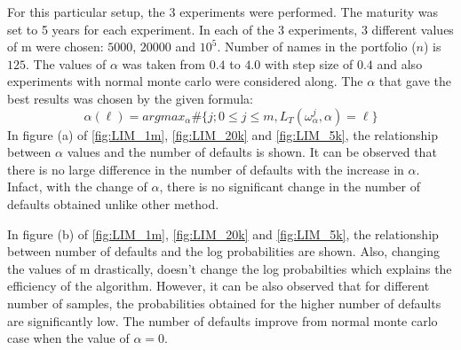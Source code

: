 For this particular setup, the 3 experiments were performed. The maturity was set to 5 years for each experiment. In each of the 3 experiments, 3 different values of m were chosen: $5000$, $20000$ and $10^{5}$. Number of names in the portfolio ($n$) is $125$. The values of $\alpha$ was taken from $0.4$ to $4.0$ with step size of $0.4$ and also experiments with normal monte carlo were considered along. The $\alpha$ that gave the best results was chosen by the given formula:
\begin{equation}
\alpha(\ell) = argmax_{\alpha} \# \{ j; 0 \leq j \leq m, L_{T}(\omega_{\alpha}^{j},\alpha) = \ell \}
\end{equation}  
In figure (a) of \ref{fig:LIM_1m}, \ref{fig:LIM_20k} and \ref{fig:LIM_5k}, the relationship between $\alpha$ values and the number of defaults is shown. It can be observed that there is no large difference in the number of defaults with the increase in $\alpha$. Infact, with the change of $\alpha$, there is no significant change in the number of defaults obtained unlike other method. 

In figure (b) of \ref{fig:LIM_1m}, \ref{fig:LIM_20k} and \ref{fig:LIM_5k}, the relationship between number of defaults and the log probabilities are shown. Also, changing the values of m drastically, doesn't change the log probabilties which explains the efficiency of the algorithm. However, it can be also observed that for different number of samples, the probabilities obtained for the higher number of defaults are significantly low. The number of defaults improve from normal monte carlo case when the value of $\alpha=0$. 